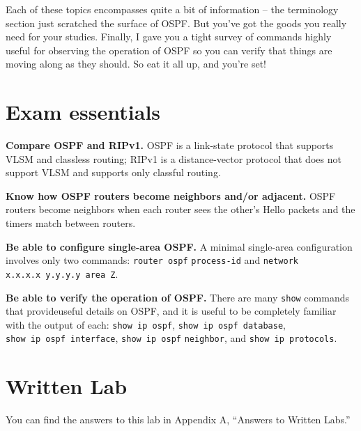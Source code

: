 Each of these topics encompasses quite a bit of information -- the
terminology section just scratched the surface of OSPF. But you've got
the goods you really need for your studies. Finally, I gave you a tight
survey of commands highly useful for observing the operation of OSPF so
you can verify that things are moving along as they should. So eat it
all up, and you're set!



\section{Exam essentials}

\textbf{Compare OSPF and RIPv1.} OSPF is a link-state protocol that
supports VLSM and classless routing; RIPv1 is a distance-vector protocol
that does not support VLSM and supports only classful routing.

\textbf{Know how OSPF routers become neighbors and/or adjacent.} OSPF
routers become neighbors when each router sees the other's Hello packets
and the timers match between routers.

\protect\hypertarget{c18.xhtmlux5cux23Page_772}{}{}\textbf{Be able to
configure single-area OSPF.} A minimal single-area configuration
involves only two commands: \texttt{router\ ospf} \texttt{process-id}
and \texttt{network} \texttt{x.x.x.x\ y.y.y.y\ area\ Z}.

\textbf{Be able to verify the operation of OSPF.} There are many
\texttt{show} commands that provideuseful details on OSPF, and it is
useful to be completely familiar with the output of each:
\texttt{show\ ip\ ospf}, \texttt{show\ ip\ ospf\ database},
\texttt{show\ ip\ ospf\ interface}, \texttt{show\ ip\ ospf}
\texttt{neighbor}, and \texttt{show\ ip\ protocols}.



\section{Written Lab}

You can find the answers to this lab in Appendix A, ``Answers to Written
Labs.''

